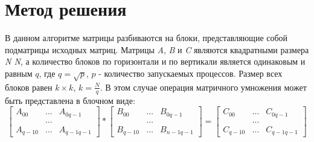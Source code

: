 \documentclass{report}
\begin{document}
\newpage

\section*{Метод решения}
В данном алгоритме матрицы разбиваются на блоки, представляющие собой подматрицы исходных матриц. Матрицы {\itshape A}, {\itshape B} и {\itshape C} являются квадратными размера {\itshape N  \times N}, а количество блоков по горизонтали и по вертикали является одинаковым и равным {\itshape $q$}, где  {\itshape $q = \sqrt p$}, {\itshape $p$} - количество запускаемых процессов. Размер всех блоков равен {\itshape $k \times k$}, {\itshape $k = \frac{N}{q} $}. В этом случае операция матричного умножения может быть представлена в блочном виде:
$$
\begin{bmatrix}
A_{00}&  \ldots & A_{0q-1}\\
& \ldots\\
A_{q-10}& \ldots & A_{q-1q-1}
\end{bmatrix}
*
\begin{bmatrix}
B_{0 0}& \ldots & B_{0 q-1}\\
& \ldots\\
B_{q-1 0}& \ldots & B_{n-1 q-1}
\end{bmatrix}
=
\begin{bmatrix}
C_{0 0}& \ldots & C_{0q-1}\\
&\ldots\\
C_{q-1 0}& \ldots & C_{q-1 q-1}
\end{bmatrix}
$$
\end{document}
